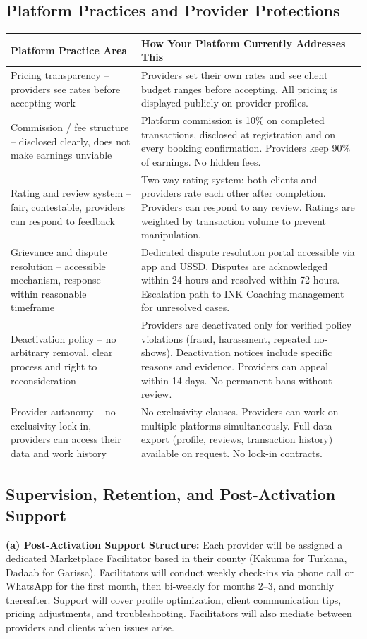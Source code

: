 \documentclass[11pt,a4paper]{article}
\begin{document}
\subsection{Platform Practices and Provider Protections}
\begin{longtable}{@{}p{6cm}p{10cm}@{}}
\textbf{Platform Practice Area} & \textbf{How Your Platform Currently Addresses This} \\
\hline
Pricing transparency -- providers see rates before accepting work & Providers set their own rates and see client budget ranges before accepting. All pricing is displayed publicly on provider profiles. \\
\hline
Commission / fee structure -- disclosed clearly, does not make earnings unviable & Platform commission is 10\% on completed transactions, disclosed at registration and on every booking confirmation. Providers keep 90\% of earnings. No hidden fees. \\
\hline
Rating and review system -- fair, contestable, providers can respond to feedback & Two-way rating system: both clients and providers rate each other after completion. Providers can respond to any review. Ratings are weighted by transaction volume to prevent manipulation. \\
\hline
Grievance and dispute resolution -- accessible mechanism, response within reasonable timeframe & Dedicated dispute resolution portal accessible via app and USSD. Disputes are acknowledged within 24 hours and resolved within 72 hours. Escalation path to INK Coaching management for unresolved cases. \\
\hline
Deactivation policy -- no arbitrary removal, clear process and right to reconsideration & Providers are deactivated only for verified policy violations (fraud, harassment, repeated no-shows). Deactivation notices include specific reasons and evidence. Providers can appeal within 14 days. No permanent bans without review. \\
\hline
Provider autonomy -- no exclusivity lock-in, providers can access their data and work history & No exclusivity clauses. Providers can work on multiple platforms simultaneously. Full data export (profile, reviews, transaction history) available on request. No lock-in contracts. \\
\end{longtable}

\subsection{Supervision, Retention, and Post-Activation Support}
\textbf{(a) Post-Activation Support Structure:} Each provider will be assigned a dedicated Marketplace Facilitator based in their county (Kakuma for Turkana, Dadaab for Garissa). Facilitators will conduct weekly check-ins via phone call or WhatsApp for the first month, then bi-weekly for months 2--3, and monthly thereafter. Support will cover profile optimization, client communication tips, pricing adjustments, and troubleshooting. Facilitators will also mediate between providers and clients when issues arise.
\end{document}
